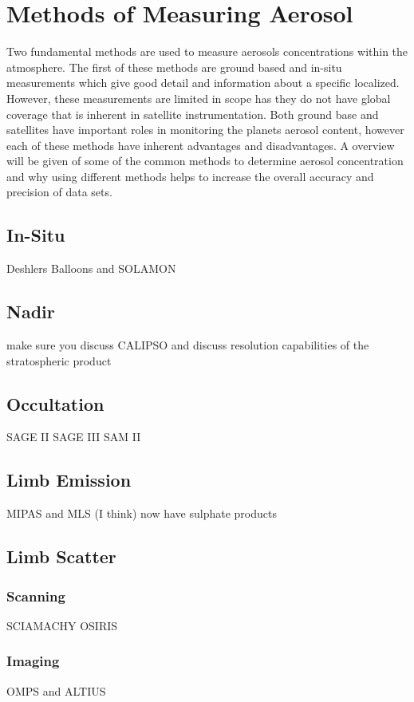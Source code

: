 \section{Methods of Measuring Aerosol}

Two fundamental methods are used to measure aerosols concentrations within the atmosphere. The first of these methods are ground based and in-situ measurements which give good detail and information about a specific localized. However, these measurements are limited in scope has they do not have global coverage that is inherent in satellite instrumentation. Both ground base and satellites have important roles in monitoring the planets aerosol content, however each of these methods have inherent advantages and disadvantages. A overview will be given of some of the common methods to determine aerosol concentration and why using different methods helps to increase the overall accuracy and precision of data sets.

\subsection{In-Situ}

Deshlers Balloons and SOLAMON

\subsection{Nadir}

make sure you discuss CALIPSO and discuss resolution capabilities of the stratospheric product

\subsection{Occultation}

SAGE II SAGE III SAM II

\subsection{Limb Emission}

MIPAS and MLS (I think) now have sulphate products

\subsection{Limb Scatter}
\subsubsection{Scanning}

SCIAMACHY OSIRIS

\subsubsection{Imaging}

OMPS and ALTIUS 